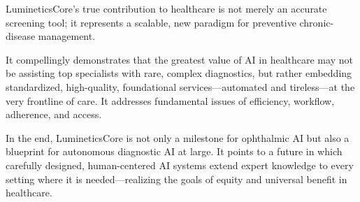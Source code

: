 \documentclass[sigplan,screen]{acmart}
\begin{document}
LumineticsCore's true contribution to healthcare is not merely an accurate screening tool; it represents a scalable, new paradigm for preventive chronic-disease management.

It compellingly demonstrates that the greatest value of AI in healthcare may not be assisting top specialists with rare, complex diagnostics, but rather embedding standardized, high-quality, foundational services---automated and tireless---at the very frontline of care. It addresses fundamental issues of efficiency, workflow, adherence, and access.

In the end, LumineticsCore is not only a milestone for ophthalmic AI but also a blueprint for autonomous diagnostic AI at large. It points to a future in which carefully designed, human-centered AI systems extend expert knowledge to every setting where it is needed---realizing the goals of equity and universal benefit in healthcare.



\end{document}
